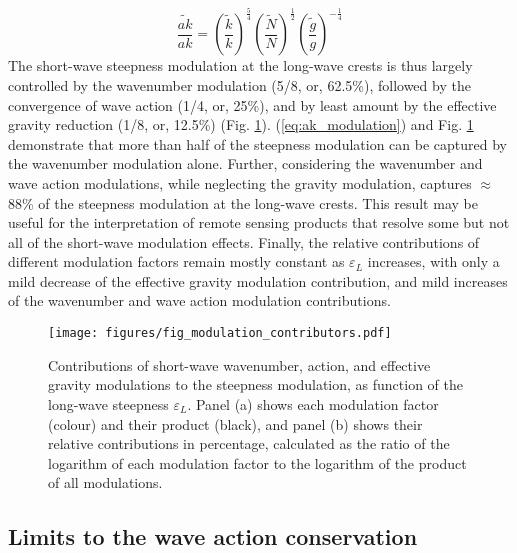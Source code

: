 \documentclass[lineno]{jfm}
\begin{document}
\begin{equation}
\label{eq:ak_modulation}
\dfrac{\widetilde{ak}}{ak} = 
  \left( \dfrac{\widetilde{k}}{k} \right)^{\frac{5}{4}}
  \left( \dfrac{\widetilde{N}}{N} \right)^{\frac{1}{2}}
  \left( \dfrac{\widetilde{g}}{g} \right)^{-\frac{1}{4}}
\end{equation}
The short-wave steepness modulation at the long-wave crests is thus largely
controlled by the wavenumber modulation (5/8, or, 62.5\%), followed by the
convergence of wave action (1/4, or, 25\%), and by least amount by the
effective gravity reduction (1/8, or, 12.5\%) (Fig. \ref{fig:modulation_contributors}).
(\ref{eq:ak_modulation}) and Fig. \ref{fig:modulation_contributors} demonstrate
that more than half of the steepness modulation can be captured by the
wavenumber modulation alone.
Further, considering the wavenumber and wave action modulations, while
neglecting the gravity modulation, captures $\approx$88\% of the steepness
modulation at the long-wave crests.
This result may be useful for the interpretation of remote sensing products
that resolve some but not all of the short-wave modulation effects.
Finally, the relative contributions of different modulation factors remain
mostly constant as $\varepsilon_L$ increases, with only a mild decrease of the
effective gravity modulation contribution, and mild increases of the
wavenumber and wave action modulation contributions.

\begin{figure}
\centering
\texttt{[image: figures/fig\_modulation\_contributors.pdf]}
\caption{
  Contributions of short-wave wavenumber, action, and effective gravity
  modulations to the steepness modulation, as function of the long-wave
  steepness $\varepsilon_L$.
  Panel (a) shows each modulation factor (colour) and their product (black),
  and panel (b) shows their relative contributions in percentage, calculated as
  the ratio of the logarithm of each modulation factor to the logarithm of the
  product of all modulations.
}
\label{fig:modulation_contributors}
\end{figure}

\subsection{Limits to the wave action conservation}
\label{sec:wave_action_conservation}
\end{document}
